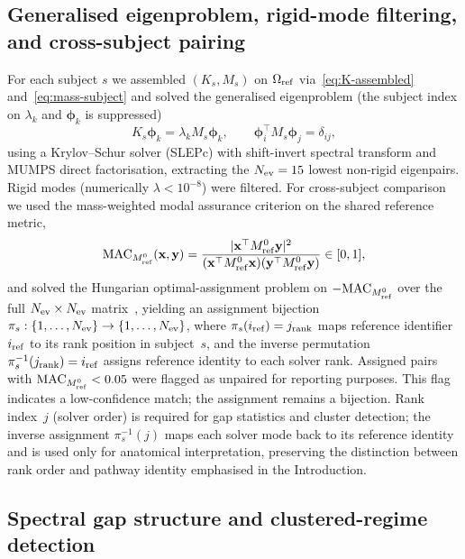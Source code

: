 \documentclass[pdflatex,sn-basic]{sn-jnl}
\begin{document}
\subsection{Generalised eigenproblem, rigid-mode filtering, and cross-subject pairing}
\label{sec:evp}

For each subject $s$ we assembled $(K_s,M_s)$ on $\Omega_{\rm ref}$ via~\eqref{eq:K-assembled} and~\eqref{eq:mass-subject} and solved the generalised eigenproblem (the subject index on $\lambda_k$ and $\boldsymbol\phi_k$ is suppressed)
\begin{equation}
K_s\boldsymbol\phi_k=\lambda_k M_s\boldsymbol\phi_k,\qquad
\boldsymbol\phi_i^\top M_s \boldsymbol\phi_j=\delta_{ij},
\label{eq:gep}
\end{equation}
using a Krylov--Schur solver (SLEPc) with shift-invert spectral transform and MUMPS direct factorisation, extracting the $N_{\rm ev}=15$ lowest non-rigid eigenpairs.
Rigid modes (numerically $\lambda<10^{-8}$) were filtered.
For cross-subject comparison we used the mass-weighted modal assurance criterion on the shared reference metric,
\begin{equation}
\mathrm{MAC}_{M_{\rm ref}^0}(\mathbf x,\mathbf y)=
\frac{|\mathbf x^\top M_{\rm ref}^{0}\mathbf y|^2}
{(\mathbf x^\top M_{\rm ref}^{0}\mathbf x)(\mathbf y^\top M_{\rm ref}^{0}\mathbf y)}\in[0,1],
\label{eq:mac}
\end{equation}
and solved the Hungarian optimal-assignment problem on $-\mathrm{MAC}_{M_{\rm ref}^0}$ over the full $N_{\rm ev}\times N_{\rm ev}$ matrix~\citep{Kuhn1955Hungarian}, yielding an assignment bijection $\pi_s: \{1,\dots,N_{\rm ev}\} \to \{1,\dots,N_{\rm ev}\}$, where $\pi_s(i_{\rm ref}) = j_{\rm rank}$ maps reference identifier $i_{\rm ref}$ to its rank position in subject~$s$, and the inverse permutation $\pi_s^{-1}(j_{\rm rank}) = i_{\rm ref}$ assigns reference identity to each solver rank.
Assigned pairs with $\mathrm{MAC}_{M_{\rm ref}^0}<0.05$ were flagged as unpaired for reporting purposes. This flag indicates a low-confidence match; the assignment remains a bijection.
Rank index~$j$ (solver order) is required for gap statistics and cluster detection; the inverse assignment $\pi_s^{-1}(j)$ maps each solver mode back to its reference identity and is used only for anatomical interpretation, preserving the distinction between rank order and pathway identity emphasised in the Introduction.


\subsection{Spectral gap structure and clustered-regime detection}
\label{sec:gaps}
\end{document}
